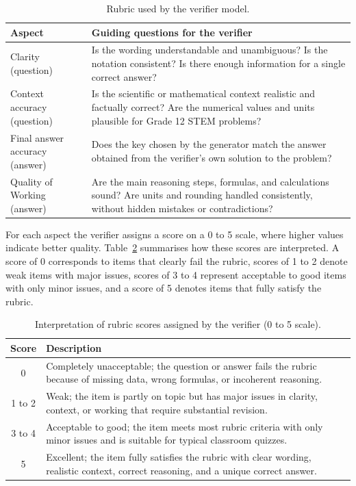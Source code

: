 ﻿\documentclass[a4paper,conference,10pt]{IEEEtran}
\begin{document}
\begin{table}[t]
\centering
\small
\caption{Rubric used by the verifier model.}
\label{tab:rubric}
\begin{tabular}{|p{2.6cm}|p{5.0cm}|}
\hline
\textbf{Aspect} & \textbf{Guiding questions for the verifier} \\ \hline
Clarity (question) &
Is the wording understandable and unambiguous? Is the notation consistent? Is there enough information for a single correct answer? \\ \hline
Context accuracy (question) &
Is the scientific or mathematical context realistic and factually correct? Are the numerical values and units plausible for Grade 12 STEM problems? \\ \hline
Final answer accuracy (answer) &
Does the key chosen by the generator match the answer obtained from the verifier's own solution to the problem? \\ \hline
Quality of Working (answer) &
Are the main reasoning steps, formulas, and calculations sound? Are units and rounding handled consistently, without hidden mistakes or contradictions? \\ \hline
\end{tabular}
\normalsize
\end{table}

For each aspect the verifier assigns a score on a 0 to 5 scale, where higher values indicate better quality. Table~\ref{tab:scores} summarises how these scores are interpreted. A score of 0 corresponds to items that clearly fail the rubric, scores of 1 to 2 denote weak items with major issues, scores of 3 to 4 represent acceptable to good items with only minor issues, and a score of 5 denotes items that fully satisfy the rubric.

\begin{table}[t]
\centering
\small
\caption{Interpretation of rubric scores assigned by the verifier (0 to 5 scale).}
\label{tab:scores}
\begin{tabular}{|c|p{5.5cm}|}
\hline
\textbf{Score} & \textbf{Description} \\ \hline
0 &
Completely unacceptable; the question or answer fails the rubric because of missing data, wrong formulas, or incoherent reasoning. \\ \hline
1 to 2 &
Weak; the item is partly on topic but has major issues in clarity, context, or working that require substantial revision. \\ \hline
3 to 4 &
Acceptable to good; the item meets most rubric criteria with only minor issues and is suitable for typical classroom quizzes. \\ \hline
5 &
Excellent; the item fully satisfies the rubric with clear wording, realistic context, correct reasoning, and a unique correct answer. \\ \hline
\end{tabular}
\normalsize
\end{table}
\end{document}
